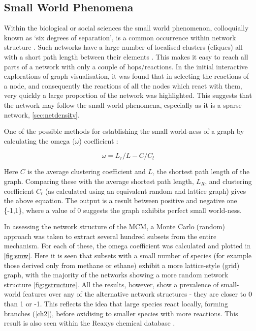 \subsection{Small World Phenomena}
Within the biological or social sciences the small world phenomenon, colloquially known as `six degrees of separation', is a common occurrence within network structure \citep{smallworld}. Such networks have a large number of localised clusters (cliques) all with a short path length between their elements \citep{sm2}. This makes it easy to reach all parts of a network with only a couple of hops/reactions. In the initial interactive explorations of graph visualisation, it was found that in selecting the reactions of a node, and consequently the reactions of all the nodes which react with them, very quickly a large proportion of the network was highlighted. This suggests that the network may follow the small world phenomena, especially as it is a sparse network, \autoref{sec:netdensity}.

One of the possible methods for establishing the small world-ness of a graph by calculating the omega ($\omega$) coefficient \citep{networkx}:

\begin{equation}
\omega = L_r/L - C/C_l
\end{equation}

Here $C$ is the average clustering coefficient and $L$, the shortest path length of the graph. Comparing these with the average shortest path length, $L_R$, and clustering coefficient $C_l$ (as calculated using an equivalent random and lattice graph) gives the above equation. The output is a result between positive and negative one \{-1,1\}, where a value of 0 suggests the graph exhibits perfect small world-ness.

In assessing the network structure of the MCM, a Monte Carlo (random) approach was taken to extract several hundred subsets from the entire mechanism. For each of these, the omega coefficient was calculated and plotted in \autoref{fig:smw}. Here it is seen that subsets with a small number of species (for example those derived only from methane or ethane) exhibit a more lattice-style (grid) graph, with the majority of the networks showing a more random network structure \autoref{fig:gstructure}. All the results, however, show a prevalence of small-world features over any of the alternative network structures - they are closer to 0 than 1 or -1. This reflects the idea that large species react locally, forming branches (\autoref{ch2}), before oxidising to smaller species with more reactions. This result is also seen within the Reaxys chemical database \citep{rscgraph}.



